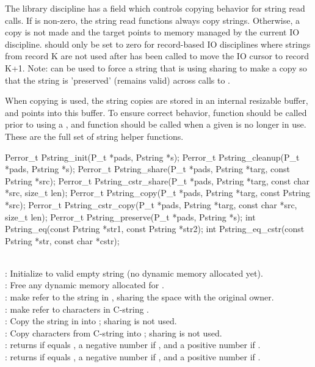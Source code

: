 The library discipline has a field  which controls
copying behavior for string read calls.  If  is
non-zero, the string read functions always copy strings. Otherwise, a
copy is not made and the target  points to memory managed by
the current IO discipline.   should only be set to
zero for record-based IO disciplines where strings from record K are
not used after  has been called to move the IO cursor
to record K+1.  Note:  can be used to force
a string that is using sharing to make a copy so that the string is
'preserved' (remains valid) across calls to .

When copying is used, the string copies are stored in an internal
resizable buffer, and  points into this buffer. 
To ensure correct behavior, function  should be called
prior to using a , and function  should
be called when a given  is no longer in use.
\\[1ex]
These are the full set of string helper functions.
\myvskip{1ex}
\begin{tinycodeaux}{\leftmargin=0in}
Perror_t Pstring_init(P_t *pads, Pstring *s);
Perror_t Pstring_cleanup(P_t *pads, Pstring *s);
Perror_t Pstring_share(P_t *pads, Pstring *targ, const Pstring *src);
Perror_t Pstring_cstr_share(P_t *pads, Pstring *targ, const char *src, size_t len);
Perror_t Pstring_copy(P_t *pads, Pstring *targ, const Pstring *src);
Perror_t Pstring_cstr_copy(P_t *pads, Pstring *targ, const char *src, size_t len);
Perror_t Pstring_preserve(P_t *pads, Pstring *s);
int Pstring_eq(const Pstring *str1, const Pstring *str2);
int Pstring_eq_cstr(const Pstring *str, const char *cstr);
\end{tinycodeaux}
\mbox{}\\[1ex]
: Initialize  to valid empty string (no dynamic memory allocated yet).\\[1ex]
: Free any dynamic memory allocated for .\\[1ex]
: make  refer to the string in ,
sharing the space with the original owner.\\[1ex]
: make  refer to  characters in C-string .\\[1ex]
: Copy the string in  into ; sharing is not used.\\[1ex]
: Copy  characters from C-string  into ; sharing is not used.\\[1ex]
: returns  if  equals , a negative number if ,
and a positive number if .\\[1ex]
: returns  if  equals , a negative number if ,
and a positive number if .\\[1ex]

